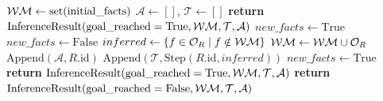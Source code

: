 \begin{algorithm}[h]
\caption{Forward Chaining Inference Engine}
\label{alg:forward_chaining}
\begin{algorithmic}[1]
    \State $\mathcal{WM} \gets \text{set}(\text{initial\_facts})$
    \State $\mathcal{A} \gets []$, $\mathcal{T} \gets []$
        \State \textbf{return} $\text{InferenceResult}(\text{goal\_reached}=\text{True}, \mathcal{WM}, \mathcal{T}, \mathcal{A})$
    \EndIf
    \State $new\_facts \gets \text{True}$
        \State $new\_facts \gets \text{False}$
                \State $inferred \gets \{ f \in \mathcal{O}_R \mid f \notin \mathcal{WM} \}$
                \State $\mathcal{WM} \gets \mathcal{WM} \cup \mathcal{O}_R$
                \State $\text{Append}(\mathcal{A}, R.\text{id})$
                \State $\text{Append}(\mathcal{T}, \text{Step}(R.\text{id}, inferred))$
                \State $new\_facts \gets \text{True}$
                    \State \textbf{return} $\text{InferenceResult}(\text{goal\_reached}=\text{True}, \mathcal{WM}, \mathcal{T}, \mathcal{A})$
                \EndIf
            \EndIf
        \EndFor
    \EndWhile
    \State \textbf{return} $\text{InferenceResult}(\text{goal\_reached}=\text{False}, \mathcal{WM}, \mathcal{T}, \mathcal{A})$
\EndProcedure
\end{algorithmic}
\end{algorithm}

